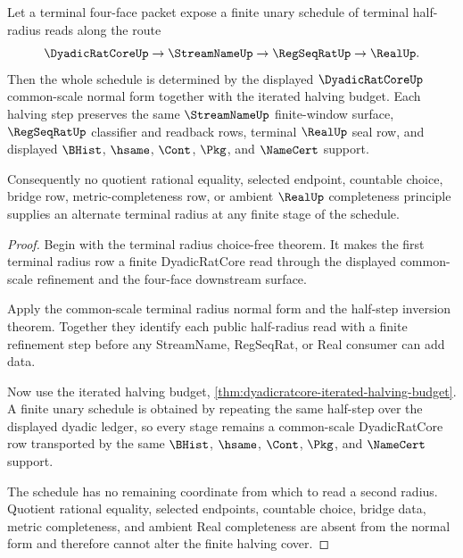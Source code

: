 \begin{theorem}
\label{thm:dyadicratcore-choice-free-halving-cover}
Let a terminal four-face packet expose a finite unary schedule of terminal half-radius reads along the route
$$
\DyadicRatCoreUp \to \StreamNameUp \to \RegSeqRatUp \to \RealUp .
$$
Then the whole schedule is determined by the displayed $\DyadicRatCoreUp$ common-scale normal form together with the iterated halving budget. Each halving step preserves the same $\StreamNameUp$ finite-window surface, $\RegSeqRatUp$ classifier and readback rows, terminal $\RealUp$ seal row, and displayed $\BHist$, $\hsame$, $\Cont$, $\Pkg$, and $\NameCert$ support.

Consequently no quotient rational equality, selected endpoint, countable choice, bridge row, metric-completeness row, or ambient $\RealUp$ completeness principle supplies an alternate terminal radius at any finite stage of the schedule.
\end{theorem}
\begin{proof}
Begin with the terminal radius choice-free theorem. It makes the first terminal radius row a finite DyadicRatCore read through the displayed common-scale refinement and the four-face downstream surface.

Apply the common-scale terminal radius normal form and the half-step inversion theorem. Together they identify each public half-radius read with a finite refinement step before any StreamName, RegSeqRat, or Real consumer can add data.

Now use the iterated halving budget, \autoref{thm:dyadicratcore-iterated-halving-budget}. A finite unary schedule is obtained by repeating the same half-step over the displayed dyadic ledger, so every stage remains a common-scale DyadicRatCore row transported by the same $\BHist$, $\hsame$, $\Cont$, $\Pkg$, and $\NameCert$ support.

The schedule has no remaining coordinate from which to read a second radius. Quotient rational equality, selected endpoints, countable choice, bridge data, metric completeness, and ambient Real completeness are absent from the normal form and therefore cannot alter the finite halving cover.
\end{proof}
